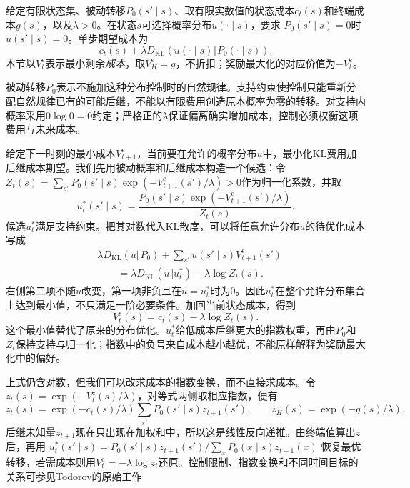 \begin{definition}[有限时域KL控制]
 \label{def:rl-planning-kl-control}
 给定有限状态集、被动转移$P_0(s'\mid s)$、取有限实数值的状态成本$c_t(s)$和终端成本$g(s)$，以及$\lambda>0$。在状态$s$可选择概率分布$u(\cdot\mid s)$，要求
 $P_0(s'\mid s)=0$时$u(s'\mid s)=0$。单步期望成本为
 \[
 c_t(s)+\lambda D_{\mathrm{KL}}(u(\cdot\mid s)\Vert P_0(\cdot\mid s)).
 \]
 本节以$V_t^{\mathrm c}$表示最小剩余\emph{成本}，取$V_H^{\mathrm c}=g$，不折扣；奖励最大化的对应价值为$-V_t^{\mathrm c}$。
\end{definition}

被动转移$P_0$表示不施加这种分布控制时的自然规律。支持约束使控制只能重新分配自然规律已有的可能后继，不能以有限费用创造原本概率为零的转移。对支持内概率采用$0\log0=0$约定；严格正的$\lambda$保证偏离确实增加成本，控制必须权衡这项费用与未来成本。

给定下一时刻的最小成本$V_{t+1}^{\mathrm c}$，当前要在允许的概率分布$u$中，最小化KL费用加后继成本期望。我们先用被动概率和后继成本构造一个候选：令
$Z_t(s)=\sum_{s'}P_0(s'\mid s)\exp(-V_{t+1}^{\mathrm c}(s')/\lambda)>0$作为归一化系数，并取
\[
 u_t^*(s'\mid s)=
 \frac{P_0(s'\mid s)\exp(-V_{t+1}^{\mathrm c}(s')/\lambda)}{Z_t(s)}.
\]
候选$u_t^*$满足支持约束。把其对数代入KL散度，可以将任意允许分布$u$的待优化成本写成
\begin{equation}
 \begin{aligned}
 &\lambda D_{\mathrm{KL}}(u\Vert P_0)
       +\sum_{s'}u(s'\mid s)V_{t+1}^{\mathrm c}(s')\\
 &\qquad=\lambda D_{\mathrm{KL}}(u\Vert u_t^*)-\lambda\log Z_t(s).
 \end{aligned}
 \label{eq:rl-planning-kl-completion}
\end{equation}
右侧第二项不随$u$改变，第一项非负且在$u=u_t^*$时为0。因此$u_t^*$在整个允许分布集合上达到最小值，不只满足一阶必要条件。加回当前状态成本，得到
\[
 V_t^{\mathrm c}(s)=c_t(s)-\lambda\log Z_t(s).
\]
这个最小值替代了原来的分布优化。$u_t^*$给低成本后继更大的指数权重，再由$P_0$和$Z_t$保持支持与归一化；指数中的负号来自成本越小越优，不能原样解释为奖励最大化中的偏好。

上式仍含对数，但我们可以改求成本的指数变换，而不直接求成本。令$z_t(s)=\exp(-V_t^{\mathrm c}(s)/\lambda)$，对等式两侧取相应指数，便有
\begin{equation}
 z_t(s)=\exp(-c_t(s)/\lambda)\sum_{s'}P_0(s'\mid s)z_{t+1}(s'),
 \qquad z_H(s)=\exp(-g(s)/\lambda).
 \label{eq:rl-planning-kl-linear}
\end{equation}
后继未知量$z_{t+1}$现在只出现在加权和中，所以这是线性反向递推。由终端值算出$z$后，再用
$u_t^*(s'\mid s)=P_0(s'\mid s)z_{t+1}(s')/\sum_xP_0(x\mid s)z_{t+1}(x)$
恢复最优转移，若需成本则用$V_t^{\mathrm c}=-\lambda\log z_t$还原。控制限制、指数变换和不同时间目标的关系可参见Todorov的原始工作

